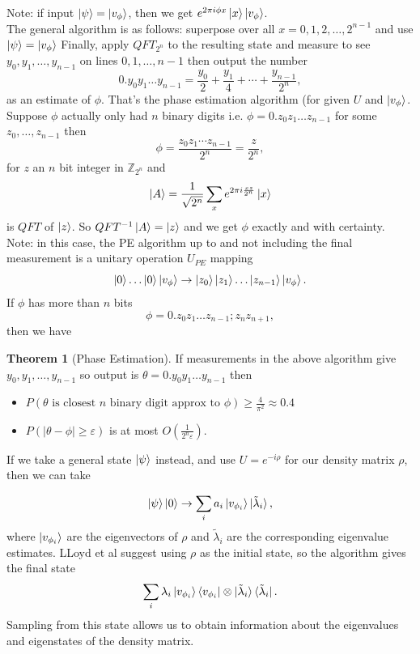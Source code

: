 \documentclass{article}
\theoremstyle{definition}
\newtheorem{thm}{Theorem}[section]
\begin{document}
Note: if input $\ket{\psi}  = \ket{v_{\phi}}$, then we get $e^{ 2 \pi i \phi x} \ket{x}\ket{v_{\phi}}$. \\


The general algorithm is as follows:  superpose over all $x = 0, 1, 2, \ldots, 2^{n - 1}$ and use $\ket{\psi } = \ket{v_{\phi}}$
Finally, apply $QFT_{2^{n}}$ to the resulting state and measure to see $y_0, y_1, \ldots, y_{n -1}$ on lines $0,1, \ldots, n-1$ then output the number
\[
0.y_0y_1\ldots y_{n - 1} = \frac{y_0}{2} + \frac{y_1}{4} + \cdots + \frac{y_{n - 1}}{2^{n}}
,\]
as an estimate of $\phi$. That's the phase estimation algorithm (for given $U$ and $\ket{v_{\phi}}$. \\
Suppose $\phi$ actually only had $n$ binary digits i.e. $ \phi = 0.z_0 z_1 \ldots z_{n - 1}$ for some $z_0, \ldots, z_{n-1}$ then
\[
\phi = \frac{z_0z_1\cdots z_{n-1}}{2^{n}} = \frac{z}{2^{n}}
,\]
for $z$ an $n$ bit integer in $\mathbb{Z}_{2^{n}}$ and 
\[
    \ket{A} = \frac{1}{\sqrt{2^{n}}} \sum_{x} e^{ 2 \pi i \frac{x z}{2^{n}}} \ket{x}  
\]
is $QFT$ of $\ket{z}$. So  $QFT^{-1} \ket{A} = \ket{z}$ and we get $\phi$ exactly and with certainty. \\
Note: in this case, the PE algorithm up to and not including the final measurement is a unitary operation $U_{PE}$ mapping
\[
    \ket{0} \ldots\ket{0} \ket{v_{\phi}} \to \ket{z_0} \ket{z_1} \ldots \ket{z_{n-1}} \ket{v_{\phi}}
.\] 
If $\phi$ has more than $n$ bits
\[
\phi = 0.z_0z_1 \ldots z_{n - 1} ; z_{n } z_{n + 1}
,\]
then we have
\begin{thm}[Phase Estimation]
If measurements in the above algorithm give $y_0, y_1, \ldots, y_{n - 1}$ so output is $\theta = 0.y_0 y_1 \ldots y_{n-1} $ then 
\begin{itemize}
    \item $P( \theta \text{ is closest } n \text{ binary digit approx to } \phi ) \ge \frac{4}{\pi ^2} \approx 0.4$ 
    \item $P(\mid \theta - \phi \mid  \ge \varepsilon)$ is at most $O\left( \frac{1}{2^{n} \varepsilon} \right) $.
\end{itemize}
\end{thm}

If we take a general state $\ket{\psi}$ instead, and use $U = e^{- i \rho }$ for our density matrix $\rho$, then we can take 

\[
\ket{\psi} \ket{0} \to \sum_i a_i \ket{v_{\phi_i}} \ket{\tilde{\lambda}_i},
\]
where $\ket{v_{\phi_i}}$ are the eigenvectors of $\rho$ and $\tilde{\lambda}_i$ are the corresponding eigenvalue estimates. LLoyd et al \cite{Lloyd_2014} suggest using $\rho$ as the initial state, so the algorithm gives the final state
\[
\sum_i \lambda_i \ket{v_{\phi_i}}  \bra{v_{\phi_i}} \otimes \ket{\tilde{\lambda}_i} \bra{\tilde{\lambda}_i}.
\]
Sampling from this state allows us to obtain information about the eigenvalues and eigenstates of the density matrix.
\end{document}

